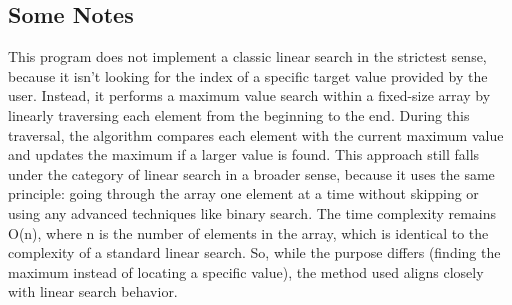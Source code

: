 \documentclass{article}
\begin{document}
  \subsection{Some Notes}

  \begin{multicols}{2}
    This program does not implement a classic linear search in the strictest sense, because it isn’t looking for the index of a specific target value provided by the user. Instead, it performs a maximum value search within a fixed-size array by linearly traversing each element from the beginning to the end. During this traversal, the algorithm compares each element with the current maximum value and updates the maximum if a larger value is found. This approach still falls under the category of linear search in a broader sense, because it uses the same principle: going through the array one element at a time without skipping or using any advanced techniques like binary search. The time complexity remains O(n), where n is the number of elements in the array, which is identical to the complexity of a standard linear search. So, while the purpose differs (finding the maximum instead of locating a specific value), the method used aligns closely with linear search behavior.
  \end{multicols}
\end{document}
